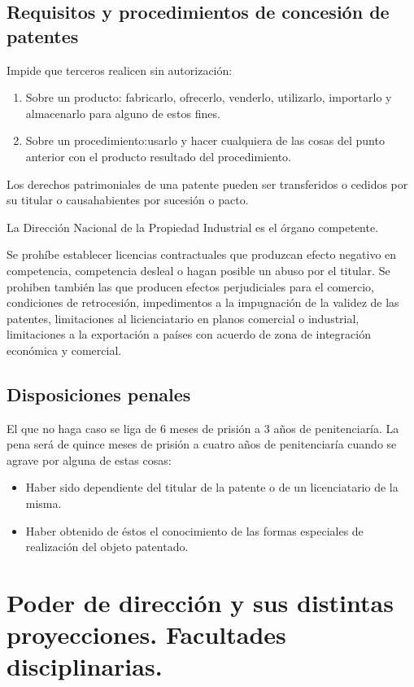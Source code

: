\documentclass[spanish,12pt,a4paper,titlepage]{report}
\begin{document}
\subsection{Requisitos y procedimientos de concesión de patentes}
Impide que terceros realicen sin autorización:
\begin{enumerate}
	\item Sobre un producto: fabricarlo, ofrecerlo, venderlo, utilizarlo, importarlo y almacenarlo para alguno de estos fines.
	\item Sobre un procedimiento:usarlo y hacer cualquiera de las cosas del punto anterior con el producto resultado del procedimiento.
\end{enumerate}

Los derechos patrimoniales de una patente pueden ser transferidos o cedidos por su titular o causahabientes por sucesión o pacto.

La Dirección Nacional de la Propiedad Industrial es el órgano competente.

Se prohíbe establecer licencias contractuales que produzcan efecto negativo en competencia, competencia desleal o hagan posible un abuso por el titular. Se prohiben también las que producen efectos perjudiciales para el comercio, condiciones de retrocesión, impedimentos a la impugnación de la validez de las patentes, limitaciones al licienciatario en planos comercial o industrial, limitaciones a la exportación a países con acuerdo de zona de integración económica y comercial.

\subsection{Disposiciones penales}
El que no haga caso se liga de 6 meses de prisión a 3 años de penitenciaría.
La pena será de quince meses de prisión a cuatro años de penitenciaría cuando se agrave por alguna de estas cosas:
\begin{itemize}
	\item Haber sido dependiente del titular de la patente o de un licenciatario de la misma.
	\item Haber obtenido de éstos el conocimiento de las formas especiales de realización del objeto patentado.
\end{itemize}

\section{Poder de dirección y sus distintas proyecciones. Facultades disciplinarias.}
\end{document}
